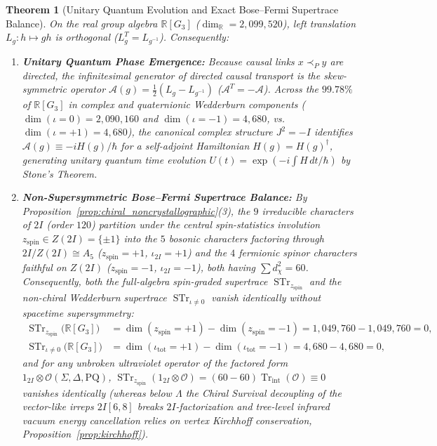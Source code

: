 \documentclass[11pt,a4paper]{article}
\newtheorem{theorem}{Theorem}[section]
\theoremstyle{definition}
\theoremstyle{remark}
\newcommand{\R}{\mathbb{R}}
\newcommand{\Tr}{\operatorname{Tr}}
\newcommand{\STr}{\operatorname{STr}}
\newcommand{\Gthree}{G_3}
\begin{document}
\begin{theorem}[Unitary Quantum Evolution and Exact Bose--Fermi Supertrace Balance]
\label{thm:quantum}
On the real group algebra $\R[\Gthree]$ ($\dim_{\R} = 2{,}099{,}520$), left translation $L_g : h \mapsto gh$ is orthogonal ($L_g^T = L_{g^{-1}}$). Consequently:
\begin{enumerate}
    \item \textbf{Unitary Quantum Phase Emergence:} Because causal links $x \prec_P y$ are directed, the infinitesimal generator of directed causal transport is the skew-symmetric operator $\mathcal{A}(g) = \frac{1}{2}(L_g - L_{g^{-1}})$ ($\mathcal{A}^T = -\mathcal{A}$). Across the $99.78\%$ of $\R[\Gthree]$ in complex and quaternionic Wedderburn components ($\dim(\iota = 0) = 2{,}090{,}160$ and $\dim(\iota = -1) = 4{,}680$, vs.\ $\dim(\iota = +1) = 4{,}680$), the canonical complex structure $J^2 = -I$ identifies $\mathcal{A}(g) \equiv -iH(g)/\hbar$ for a self-adjoint Hamiltonian $H(g) = H(g)^\dagger$, generating unitary quantum time evolution $U(t) = \exp(-i\int H\,dt/\hbar)$ by Stone's Theorem.
    \item \textbf{Non-Supersymmetric Bose--Fermi Supertrace Balance:} By Proposition~\ref{prop:chiral_noncrystallographic}(3), the $9$ irreducible characters of $2I$ (order $120$) partition under the central spin-statistics involution $z_{\mathrm{spin}} \in Z(2I) = \{\pm 1\}$ into the $5$ bosonic characters factoring through $2I/Z(2I) \cong A_5$ ($z_{\mathrm{spin}} = +1$, $\iota_{2I} = +1$) and the $4$ fermionic spinor characters faithful on $Z(2I)$ ($z_{\mathrm{spin}} = -1$, $\iota_{2I} = -1$), both having $\sum d_\chi^2 = 60$. Consequently, both the full-algebra spin-graded supertrace $\STr_{z_{\mathrm{spin}}}$ and the non-chiral Wedderburn supertrace $\STr_{\iota \neq 0}$ vanish identically without spacetime supersymmetry:
    \begin{equation}
    \begin{aligned}
    \STr_{z_{\mathrm{spin}}}\bigl(\R[\Gthree]\bigr) &= \dim(z_{\mathrm{spin}}=+1) - \dim(z_{\mathrm{spin}}=-1) = 1{,}049{,}760 - 1{,}049{,}760 = 0, \\
    \STr_{\iota \neq 0}\bigl(\R[\Gthree]\bigr) &= \dim(\iota_{\mathrm{tot}}=+1) - \dim(\iota_{\mathrm{tot}}=-1) = 4{,}680 - 4{,}680 = 0,
    \end{aligned}
    \end{equation}
    and for any unbroken ultraviolet operator of the factored form $1_{2I} \otimes \mathcal{O}(\Sigma,\Delta,\mathrm{PQ})$, $\STr_{z_{\mathrm{spin}}}(1_{2I} \otimes \mathcal{O}) = (60 - 60)\Tr_{\mathrm{int}}(\mathcal{O}) \equiv 0$ vanishes identically (whereas below $\Lambda$ the Chiral Survival decoupling of the vector-like irreps $2I[6,8]$ breaks $2I$-factorization and tree-level infrared vacuum energy cancellation relies on vertex Kirchhoff conservation, Proposition~\ref{prop:kirchhoff}).
\end{enumerate}
\end{theorem}
\end{document}
